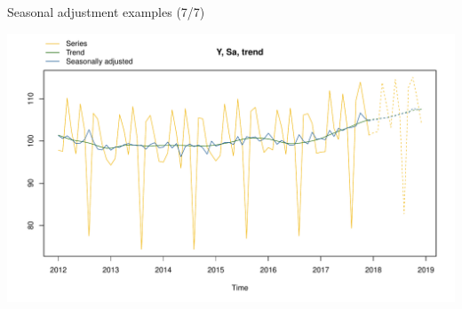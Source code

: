 \documentclass[10pt,xcolor=table,color={dvipsnames,usenames},ignorenonframetext,usepdftitle=false,french]{beamer}
\newenvironment{Shaded}{\begin{snugshade}}{\end{snugshade}}
\newcommand{\DataTypeTok}[1]{\textcolor[rgb]{0.13,0.29,0.53}{#1}}
\newcommand{\DecValTok}[1]{\textcolor[rgb]{0.00,0.00,0.81}{#1}}
\newcommand{\KeywordTok}[1]{\textcolor[rgb]{0.13,0.29,0.53}{\textbf{#1}}}
\newcommand{\NormalTok}[1]{#1}
\newcommand{\OperatorTok}[1]{\textcolor[rgb]{0.81,0.36,0.00}{\textbf{#1}}}
\newcommand{\StringTok}[1]{\textcolor[rgb]{0.31,0.60,0.02}{#1}}
\begin{document}
\begin{frame}[fragile]{Seasonal adjustment examples (7/7)}
\protect\hypertarget{seasonal-adjustment-examples-77}{}

\begin{Shaded}
\end{Shaded}

\includegraphics{img/markdown-unnamed-chunk-11-1.pdf}

\end{frame}
\end{document}
